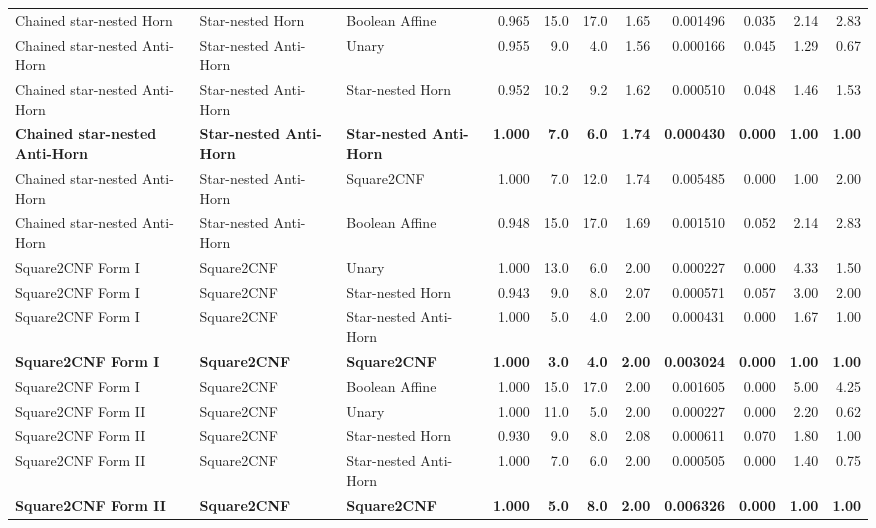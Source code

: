 \begin{tabular}{lllrrrrrrrr}
Chained star-nested Horn & Star-nested Horn & Boolean Affine & 0.965 & 15.0 & 17.0 & 1.65 & 0.001496 & 0.035 & 2.14 & 2.83 \\
Chained star-nested Anti-Horn & Star-nested Anti-Horn & Unary & 0.955 & 9.0 & 4.0 & 1.56 & 0.000166 & 0.045 & 1.29 & 0.67 \\
Chained star-nested Anti-Horn & Star-nested Anti-Horn & Star-nested Horn & 0.952 & 10.2 & 9.2 & 1.62 & 0.000510 & 0.048 & 1.46 & 1.53 \\
\textbf{Chained star-nested Anti-Horn} & \textbf{Star-nested Anti-Horn} & \textbf{Star-nested Anti-Horn} & \textbf{1.000} & \textbf{7.0} & \textbf{6.0} & \textbf{1.74} & \textbf{0.000430} & \textbf{0.000} & \textbf{1.00} & \textbf{1.00} \\
Chained star-nested Anti-Horn & Star-nested Anti-Horn & Square2CNF & 1.000 & 7.0 & 12.0 & 1.74 & 0.005485 & 0.000 & 1.00 & 2.00 \\
Chained star-nested Anti-Horn & Star-nested Anti-Horn & Boolean Affine & 0.948 & 15.0 & 17.0 & 1.69 & 0.001510 & 0.052 & 2.14 & 2.83 \\
Square2CNF Form I & Square2CNF & Unary & 1.000 & 13.0 & 6.0 & 2.00 & 0.000227 & 0.000 & 4.33 & 1.50 \\
Square2CNF Form I & Square2CNF & Star-nested Horn & 0.943 & 9.0 & 8.0 & 2.07 & 0.000571 & 0.057 & 3.00 & 2.00 \\
Square2CNF Form I & Square2CNF & Star-nested Anti-Horn & 1.000 & 5.0 & 4.0 & 2.00 & 0.000431 & 0.000 & 1.67 & 1.00 \\
\textbf{Square2CNF Form I} & \textbf{Square2CNF} & \textbf{Square2CNF} & \textbf{1.000} & \textbf{3.0} & \textbf{4.0} & \textbf{2.00} & \textbf{0.003024} & \textbf{0.000} & \textbf{1.00} & \textbf{1.00} \\
Square2CNF Form I & Square2CNF & Boolean Affine & 1.000 & 15.0 & 17.0 & 2.00 & 0.001605 & 0.000 & 5.00 & 4.25 \\
Square2CNF Form II & Square2CNF & Unary & 1.000 & 11.0 & 5.0 & 2.00 & 0.000227 & 0.000 & 2.20 & 0.62 \\
Square2CNF Form II & Square2CNF & Star-nested Horn & 0.930 & 9.0 & 8.0 & 2.08 & 0.000611 & 0.070 & 1.80 & 1.00 \\
Square2CNF Form II & Square2CNF & Star-nested Anti-Horn & 1.000 & 7.0 & 6.0 & 2.00 & 0.000505 & 0.000 & 1.40 & 0.75 \\
\textbf{Square2CNF Form II} & \textbf{Square2CNF} & \textbf{Square2CNF} & \textbf{1.000} & \textbf{5.0} & \textbf{8.0} & \textbf{2.00} & \textbf{0.006326} & \textbf{0.000} & \textbf{1.00} & \textbf{1.00} \\

\end{tabular}
